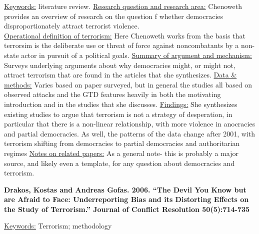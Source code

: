 \documentclass{article}[12pt]
\begin{document}
\underline{Keywords:} literature review.
\underline{Research question and research area:} Chenoweth provides an overview of research on the question f whether democracies disproportionately attract terrorist violence. \\
\underline{Operational definition of terrorism:} Here Chenoweth works from the basis that terrorsim is the deliberate use or threat of force against noncombatants by a non-state actor in pursuit of a political goals.
\underline{Summary of argument and mechanism:} Surveys underlying arguments about why democracies might, or might not, attract terrorism that are found in the articles that she synthesizes. 
\underline{Data \& methods:} Varies based on paper surveyed, but in general the studies all based on observed attacks and the GTD features heavily in both the motivating introduction and in the studies that she discusses. 
\underline{Findings:} She synthesizes existing studies to argue that terrorism is not a strategy of desperation, in particular that there is a non-linear relationship, with more violence in anocracies and partial democracies. As well, the patterns of the data change after 2001, with terrorism shifting from democracies to partial democracies and authoritarian regimes
\underline{Notes on related papers:} As a general note- this is probably a major source, and likely even a template, for any question about democracies and terrorism.

\textbf{Drakos, Kostas and Andreas Gofas. 2006. “The Devil You Know but are Afraid to Face:
Underreporting Bias and its Distorting Effects on the Study of Terrorism.” Journal of Conflict Resolution 50(5):714-735}

\underline{Keywords:} Terrorism; methodology
\end{document}
